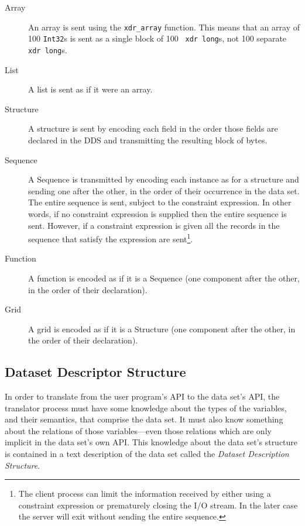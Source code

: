 \begin{description}

\item [Array] An array is sent using the {\tt xdr\_array} function. This means
  that an array of 100 {\tt Int32}s is sent as a single block of 100 {\tt
    xdr long}s, not 100 separate {\tt xdr long}s. 

\item [List] A list is sent as if it were an array.

\item [Structure] A structure is sent by encoding each field in the order
  those fields are declared in the DDS and transmitting the resulting block
  of bytes.

\item [Sequence] A Sequence is transmitted by encoding each instance as for a
  structure and sending one after the other, in the order of their occurrence
  in the data set. The entire sequence is sent, subject to the constraint
  expression. In other words, if no constraint expression is supplied then
  the entire sequence is sent. However, if a constraint expression is given
  all the records in the sequence that satisfy the expression are
  sent\footnote{The client process can limit the information received by
    either using a constraint expression or prematurely closing the I/O
    stream. In the later case the server will exit without sending the entire
    sequence.}.

\item [Function] A function is encoded as if it is a Sequence (one component
  after the other, in the order of their declaration).

\item [Grid] A grid is encoded as if it is a Structure (one component
  after the other, in the order of their declaration).

\end{description}

\subsection{Dataset Descriptor Structure}
\label{api:dds}

In order to translate from the user program's API to the data set's API, the
translator process must have some knowledge about the types of the variables,
and their semantics, that comprise the data set. It must also know something
about the relations of those variables---even those relations which are only
implicit in the data set's own API\@. This knowledge about the data set's
structure is contained in a text description of the data set called the {\em
  Dataset Description Structure}.

